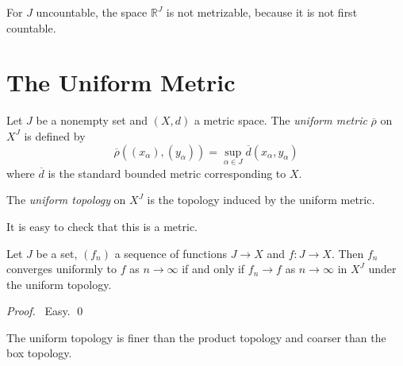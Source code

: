 \begin{ex}
  For $J$ uncountable, the space $\mathbb{R}^J$ is not metrizable, because it is not first countable.
\end{ex}

\section{The Uniform Metric}

\begin{df}
  Let $J$ be a nonempty set and $(X,d)$ a metric space. The \emph{uniform metric} $\overline{\rho}$ on $X^J$ is defined by
  \[ \overline{\rho}((x_\alpha), (y_\alpha)) = \sup_{\alpha \in J} \overline{d}(x_\alpha, y_\alpha) \]
  where $\overline{d}$ is the standard bounded metric corresponding to $X$.

  The \emph{uniform topology} on $X^J$ is the topology induced by the uniform metric.
\end{df}

It is easy to check that this is a metric.

\begin{prop}
  Let $J$ be a set, $(f_n)$ a sequence of functions $J \rightarrow X$ and $f : J \rightarrow X$. Then $f_n$ converges uniformly to $f$ as $n \rightarrow \infty$ if and only if $f_n \rightarrow f$ as $n \rightarrow \infty$ in $X^J$ under the uniform topology.
\end{prop}

\begin{proof}
  \pf\ Easy. \qed
\end{proof}

\begin{prop}[DC]
  The uniform topology is finer than the product topology and coarser than the box topology.
\end{prop}

